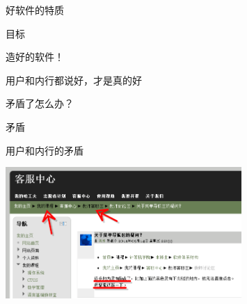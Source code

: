 \documentclass[]{beamer}
\begin{document}
\begin{frame}{好软件的特质}
  \begin{block}{目标}
    \begin{center}
      \Huge 造好的软件！
    \end{center}
  \end{block}
  \pause
  \begin{block}{}
    \begin{center}
      \LARGE 用户和内行都说好，才是真的好
    \end{center}
  \end{block}
  \pause
  \begin{block}{}
    \begin{center}
      \LARGE \alert{矛盾}了怎么办？
    \end{center}
  \end{block}
\end{frame}

\begin{frame}{矛盾}
  \begin{block}{用户和内行的矛盾}
    \begin{center}
      \includegraphics[height=5cm]{cms_navbar.png}
    \end{center}
  \end{block}
\end{frame}
\end{document}

